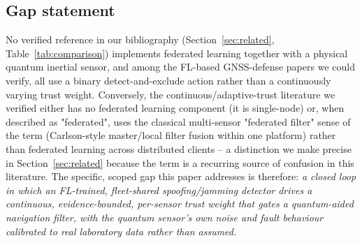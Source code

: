 \documentclass[journal]{IEEEtran}
\begin{document}
\subsection{Gap statement}
\label{sec:gap}
No verified reference in our bibliography (Section~\ref{sec:related}, Table~\ref{tab:comparison})
implements federated learning together with a physical quantum inertial sensor, and among the FL-based
GNSS-defense papers we could verify, all use a binary detect-and-exclude action rather than a
continuously varying trust weight. Conversely, the continuous/adaptive-trust literature we verified
either has no federated learning component (it is single-node) or, when described as "federated", uses
the classical multi-sensor "federated filter" sense of the term (Carlson-style master/local filter
fusion within one platform) rather than federated learning across distributed clients
\cite{negru2024resilient} -- a distinction we make precise in Section~\ref{sec:related} because the
term is a recurring source of confusion in this literature. The specific, scoped gap this paper
addresses is therefore: \emph{a closed loop in which an FL-trained, fleet-shared spoofing/jamming
detector drives a continuous, evidence-bounded, per-sensor trust weight that gates a quantum-aided
navigation filter, with the quantum sensor's own noise and fault behaviour calibrated to real
laboratory data rather than assumed.}
\end{document}
